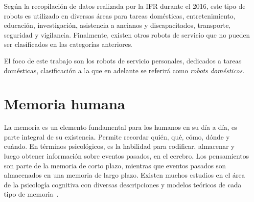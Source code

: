 Según la recopilación de datos realizada por la IFR durante el 2016, este tipo de robots es utilizado en diversas áreas para tareas domésticas, entretenimiento, educación, investigación, asistencia a ancianos y discapacitados, transporte, seguridad y vigilancia. Finalmente, existen otros robots de servicio que no pueden ser clasificados en las categorías anteriores.

El foco de este trabajo son los robots de servicio personales, dedicados a tareas domésticas, clasificación a la que en  adelante se referirá como \textit{robots domésticos}.










\section{Memoria humana}\label{sec:human_memory}

La memoria es un elemento fundamental para los humanos en su día a día, es parte integral de su existencia. Permite recordar quién, qué, cómo, dónde y cuándo. En términos psicológicos, es la habilidad para codificar, almacenar y luego obtener información sobre eventos pasados, en el cerebro. Los pensamientos son parte de la memoria de corto plazo, mientras que eventos pasados son almacenados en una memoria de largo plazo. Existen muchos estudios en el área de la psicología cognitiva con diversas descripciones y modelos teóricos de cada tipo de memoria~\cite{Vijayakumar2014}.

